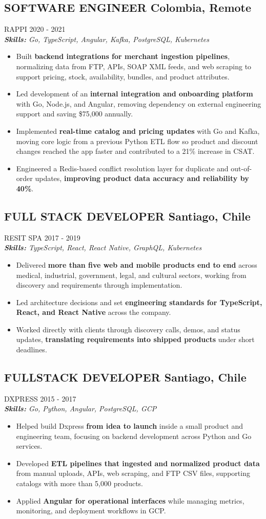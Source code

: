\documentclass{article}
\newcommand{\WorkExperience}[2]{
   \subsection*{#1}
   \vspace{-1em}
   \uppercase{#2}
}
\newcommand{\Skills}[1]{
   \textit{\textbf{Skills:} #1}
}
\begin{document}
\WorkExperience{SOFTWARE ENGINEER \hfill Colombia, Remote}{Rappi \hfill 2020 {-} 2021} \\
\Skills{Go, TypeScript, Angular, Kafka, PostgreSQL, Kubernetes}
\begin{itemize}
	\item Built \textbf{backend integrations for merchant ingestion pipelines}, normalizing data from FTP, APIs, SOAP XML feeds, and web scraping to support pricing, stock, availability, bundles, and product attributes.
	\item Led development of an \textbf{internal integration and onboarding platform} with Go, Node.js, and Angular, removing dependency on external engineering support and saving \$75,000 annually.
	\item Implemented \textbf{real-time catalog and pricing updates} with Go and Kafka, moving core logic from a previous Python ETL flow so product and discount changes reached the app faster and contributed to a 21\% increase in CSAT.
	\item Engineered a Redis-based conflict resolution layer for duplicate and out-of-order updates, \textbf{improving product data accuracy and reliability by 40\%}.
\end{itemize}

\WorkExperience{FULL STACK DEVELOPER \hfill Santiago, Chile}{Resit SPA \hfill 2017 {-} 2019} \\
\Skills{TypeScript, React, React Native, GraphQL, Kubernetes}
\begin{itemize}
	\item Delivered \textbf{more than five web and mobile products end to end} across medical, industrial, government, legal, and cultural sectors, working from discovery and requirements through implementation.
	\item Led architecture decisions and set \textbf{engineering standards for TypeScript, React, and React Native} across the company.
	\item Worked directly with clients through discovery calls, demos, and status updates, \textbf{translating requirements into shipped products} under short deadlines.
\end{itemize}

\WorkExperience{FULLSTACK DEVELOPER \hfill Santiago, Chile}{Dxpress \hfill 2015 {-} 2017} \\
\Skills{Go, Python, Angular, PostgreSQL, GCP}
\begin{itemize}
	\item Helped build Dxpress \textbf{from idea to launch} inside a small product and engineering team, focusing on backend development across Python and Go services.
	\item Developed \textbf{ETL pipelines that ingested and normalized product data} from manual uploads, APIs, web scraping, and FTP CSV files, supporting catalogs with more than 5,000 products.
	\item Applied \textbf{Angular for operational interfaces} while managing metrics, monitoring, and deployment workflows in GCP.
\end{itemize}
\end{document}
